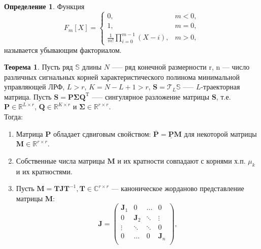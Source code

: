 \documentclass[specialist, substylefile = spbureport.rtx, subf,href,colorlinks=true, 12pt]{disser}
\theoremstyle{definition}
\newtheorem{definition}{Определение}
\newtheorem{theorem}{Теорема}
\begin{document}
\begin{definition}
        Функция
        \begin{equation*}
            F_m[X] = \begin{cases}
            0, & m < 0, \\
            1, & m = 0, \\
            \frac{1}{m!}\prod_{i=0}^{m - 1}(X - i), & m>0,
            \end{cases}
        \end{equation*}
        называется убывающим факториалом.
    \end{definition}

\begin{theorem}
\label{th4}
Пусть ряд $\mathbb{S}$ длины $N$ --— ряд конечной размерности r, n --- число различных сигнальных корней характеристического полинома минимальной управляющей ЛРФ, $L > r$, $K = N - L + 1 > r$, $\mathbf{S} = \mathcal{T}_L\mathbb{S}$ --— $L$-траекторная матрица. Пусть $\mathbf{S} = \mathbf{P\Sigma Q}^{\mathrm{T}}$ --— сингулярное разложение матрицы $\mathbf{S}$, т.е. $\mathbf{P} \in \mathbb{R}^{L \times r}$, $\mathbf{Q} \in \mathbb{R}^{K \times r}$ и $\mathbf{\Sigma} \in \mathbb{R}^{r \times r}$. \\
    \hspace*{0.5cm} Тогда:
    \begin{enumerate}
        \item Матрица $\mathbf{P}$ обладает сдвиговым свойством: $\overline{\mathbf{P}} = \underline{\mathbf{P}}\mathbf{M}$ для некоторой матрицы $\mathbf{M} \in \mathbb{R}^{r \times r}$.
        \item Собственные числа матрицы $\mathbf{M}$ и их кратности совпадают с корнями х.п. $\mu_k$ и их кратностями.
        \item Пусть $\mathbf{M} = \mathbf{TJ}\mathbf{T}^{-1}, \mathbf{T} \in \mathbb{C}^{r \times r}$ --- каноническое жорданово представление матрицы $\mathbf{M}$:
        \begin{equation*}
            \mathbf{J} = \begin{pmatrix}
                    \mathbf{J}_1 & 0 & \ldots & 0\\
                    0 & \mathbf{J}_2 & \ddots & \vdots \\
                    \vdots & \ddots & \ddots & 0 \\
                    0 & \ldots & 0 & \mathbf{J}_n \\
                    \end{pmatrix},

\end{equation*}
\end{enumerate}
\end{theorem}
\end{document}
